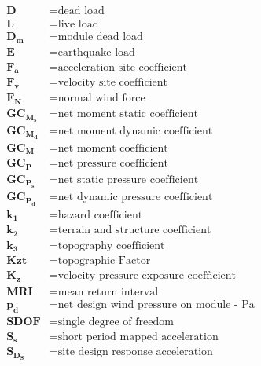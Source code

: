 \begin{align}
    \bm{D}       & = \textrm{dead load}                               \\
    \bm{L}       & = \textrm{live load}                               \\
    \bm{D_m}     & = \textrm{module dead load}                        \\
    \bm{E}       & = \textrm{earthquake load}                         \\
    \bm{F_a}     & = \textrm{acceleration site coefficient}           \\
    \bm{F_v}     & = \textrm{velocity site coefficient}               \\
    \bm{F_N}     & = \textrm{normal wind force}                       \\
    \bm{GC_M_s}  & = \textrm{net moment static coefficient}           \\
    \bm{GC_M_d}  & = \textrm{net moment dynamic coefficient}          \\
    \bm{GC_M}    & = \textrm{net moment coefficient}                  \\
    \bm{GC_P}    & = \textrm{net pressure coefficient}                \\
    \bm{GC_P_s}  & = \textrm{net static pressure coefficient}         \\
    \bm{GC_P_d}  & = \textrm{net dynamic pressure coefficient}        \\
    \bm{k_1}     & = \textrm{hazard coefficient}                      \\
    \bm{k_2}     & = \textrm{terrain and structure coefficient}       \\
    \bm{k_3}     & = \textrm{topography coefficient}                  \\
    \bm{Kzt}     & = \textrm{topographic Factor}                      \\
    \bm{K_z}     & = \textrm{velocity pressure exposure coefficient}  \\
    \bm{MRI}     & = \textrm{mean return interval}                    \\
    \bm{p_d}     & = \textrm{net design wind pressure on module - Pa} \\
    \bm{SDOF}    & = \textrm{single degree of freedom}                \\
    \bm{S_s}     & = \textrm{short period mapped acceleration}        \\
    \bm{S_D_S}   & = \textrm{site design response acceleration}       \\

\end{align}
